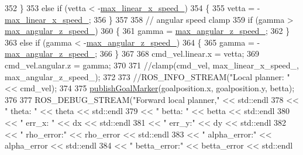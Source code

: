 \begin{DoxyCode}
{352     \}
353     \textcolor{keywordflow}{else} \textcolor{keywordflow}{if} (vetta < -\hyperlink{classmove__base__z__client_1_1forward__local__planner_1_1ForwardLocalPlanner_ad08d97c8679f1da4455de4e03e1861ae}{max\_linear\_x\_speed\_})
354     \{
355         vetta = -\hyperlink{classmove__base__z__client_1_1forward__local__planner_1_1ForwardLocalPlanner_ad08d97c8679f1da4455de4e03e1861ae}{max\_linear\_x\_speed\_};
356     \}
357 
358     \textcolor{comment}{// angular speed clamp}
359     \textcolor{keywordflow}{if} (gamma > \hyperlink{classmove__base__z__client_1_1forward__local__planner_1_1ForwardLocalPlanner_a52996ed5c43810e10ae1d4455556d3a0}{max\_angular\_z\_speed\_})
360     \{
361         gamma = \hyperlink{classmove__base__z__client_1_1forward__local__planner_1_1ForwardLocalPlanner_a52996ed5c43810e10ae1d4455556d3a0}{max\_angular\_z\_speed\_};
362     \}
363     \textcolor{keywordflow}{else} \textcolor{keywordflow}{if} (gamma < -\hyperlink{classmove__base__z__client_1_1forward__local__planner_1_1ForwardLocalPlanner_a52996ed5c43810e10ae1d4455556d3a0}{max\_angular\_z\_speed\_})
364     \{
365         gamma = -\hyperlink{classmove__base__z__client_1_1forward__local__planner_1_1ForwardLocalPlanner_a52996ed5c43810e10ae1d4455556d3a0}{max\_angular\_z\_speed\_};
366     \}
367 
368     cmd\_vel.linear.x = vetta;
369     cmd\_vel.angular.z = gamma;
370 
371     \textcolor{comment}{//clamp(cmd\_vel, max\_linear\_x\_speed\_, max\_angular\_z\_speed\_);}
372 
373     \textcolor{comment}{//ROS\_INFO\_STREAM("Local planner: "<< cmd\_vel);}
374 
375     \hyperlink{classmove__base__z__client_1_1forward__local__planner_1_1ForwardLocalPlanner_a75346bffc10020b4b2af26835039990a}{publishGoalMarker}(goalposition.x, goalposition.y, betta);
376 
377     ROS\_DEBUG\_STREAM(\textcolor{stringliteral}{"Forward local planner,"} << std::endl
378                                               << \textcolor{stringliteral}{" theta: "} << theta << std::endl
379                                               << \textcolor{stringliteral}{" betta: "} << betta << std::endl
380                                               << \textcolor{stringliteral}{" err\_x: "} << dx << std::endl
381                                               << \textcolor{stringliteral}{" err\_y:"} << dy << std::endl
382                                               << \textcolor{stringliteral}{" rho\_error:"} << rho\_error << std::endl
383                                               << \textcolor{stringliteral}{" alpha\_error:"} << alpha\_error << std::endl
384                                               << \textcolor{stringliteral}{" betta\_error:"} << betta\_error << std::endl
}
\end{DoxyCode}
